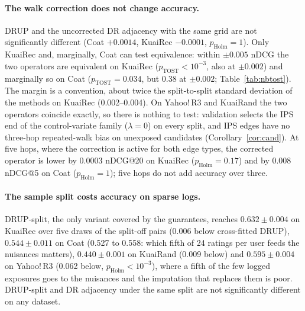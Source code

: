 \paragraph{The walk correction does not change accuracy.} DRUP and the uncorrected
DR adjacency with the same grid are not significantly different (Coat $+0.0014$,
KuaiRec $-0.0001$, $p_{\mathrm{Holm}}=1$). Only KuaiRec and, marginally, Coat can
test equivalence: within $\pm0.005$ nDCG the two operators are equivalent on KuaiRec
($p_{\mathrm{TOST}}<10^{-3}$, also at $\pm0.002$) and marginally so on Coat
($p_{\mathrm{TOST}}=0.034$, but 0.38 at $\pm0.002$; Table~\ref{tab:nbtost}). The margin
is a convention, about twice the split-to-split standard deviation of the methods on
KuaiRec (0.002--0.004). On Yahoo!\,R3 and KuaiRand the two operators coincide
exactly, so there is nothing to test: validation selects the IPS end of the
control-variate family ($\lambda=0$) on every split, and IPS edges have no three-hop
repeated-walk bias on unexposed candidates (Corollary~\ref{cor:cand}). At five hops,
where the correction is active for both edge types, the corrected operator is lower
by 0.0003 nDCG@20 on KuaiRec ($p_{\mathrm{Holm}}=0.17$) and by 0.008 nDCG@5 on Coat
($p_{\mathrm{Holm}}=1$); five hops do not add accuracy over three.

\paragraph{The sample split costs accuracy on sparse logs.} DRUP-split, the only
variant covered by the guarantees, reaches $0.632\pm0.004$ on KuaiRec over five draws
of the split-off pairs (0.006 below cross-fitted DRUP), $0.544\pm0.011$ on Coat (0.527
to 0.558: which fifth of 24 ratings per user feeds the nuisances matters),
$0.440\pm0.001$ on KuaiRand (0.009 below) and $0.595\pm0.004$ on Yahoo!\,R3 (0.062
below, $p_{\mathrm{Holm}}<10^{-3}$), where a fifth of the few logged exposures goes
to the nuisances and the imputation that replaces them is poor.
DRUP-split and DR adjacency under the same split are not significantly different on any dataset.

